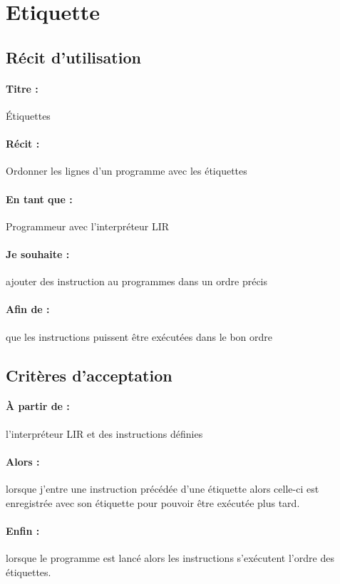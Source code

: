 \section{Etiquette}
    \subsection*{Récit d'utilisation}

    \paragraph{Titre : } Étiquettes
    \paragraph{Récit : } Ordonner les lignes d'un programme avec les étiquettes
    \paragraph{En tant que : } Programmeur avec l'interpréteur LIR
    \paragraph{Je souhaite : } ajouter des instruction au programmes dans un ordre précis
    \paragraph{Afin de : } que les instructions puissent être exécutées dans le bon ordre

    \subsection*{Critères d'acceptation}

    \paragraph{À partir de : } l'interpréteur LIR et des instructions définies
    \paragraph{Alors : } lorsque j'entre une instruction précédée d'une étiquette alors celle-ci est enregistrée avec son étiquette pour pouvoir être exécutée plus tard.
    \paragraph{Enfin : } lorsque le programme est lancé alors les instructions s'exécutent l'ordre des étiquettes.
